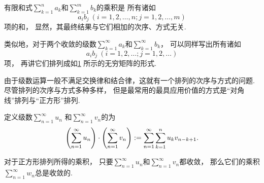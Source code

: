 有限和式\(\sum_{k=1}^n a_k\)和\(\sum_{k=1}^m b_k\)的乘积是
所有诸如\begin{equation*}
	a_i b_j\ (i=1,2,\dotsc,n;j=1,2,\dotsc,m)
\end{equation*}项的和，
显然，其最终结果与它们相加的次序、方式无关.

类似地，对于两个收敛的级数\(\sum_{k=1}^\infty a_k\)和\(\sum_{k=1}^\infty b_k\)，
可以同样写出所有诸如\begin{equation*}
	a_i b_j\ (i=1,2,\dotsc;j=1,2,\dotsc)
\end{equation*}项，
再讲它们排列成如\cref{figure:无穷级数.无穷级数乘积各项的矩阵} 所示的无穷矩阵的形式.
\begin{figure}[htb]
	\centering
	\def\term#1#2{\draw({\number#2-1},{1-\number#1})node{$a_#1 b_#2$};}
	\caption{}
	\label{figure:无穷级数.无穷级数乘积各项的矩阵}
\end{figure}

由于级数运算一般不满足交换律和结合律，这就有一个排列的次序与方式的问题.
尽管排列的次序与方式多种多样，
但是最常用的最具应用价值的方式是“对角线”排列与“正方形”排列.

\begin{definition}\label{definition:无穷级数.绝对收敛级数的柯西乘积}
定义级数\(\sum_{n=1}^\infty u_n\)
和\(\sum_{n=1}^\infty v_n\)的为\begin{equation*}
	\left( \sum_{n=1}^\infty u_n \right)
	\cdot
	\left( \sum_{n=1}^\infty v_n \right)
	:=
	\sum_{n=1}^\infty \sum_{k=1}^n u_k v_{n-k+1}.
\end{equation*}
\end{definition}

对于正方形排列所得的乘积，
只要\(\sum_{n=1}^\infty u_n\)和\(\sum_{n=1}^\infty v_n\)都收敛，
那么它们的乘积\(\sum_{n=1}^\infty w_n\)总是收敛的.

